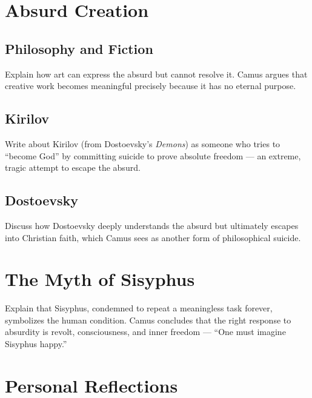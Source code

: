 \documentclass[12pt,letterpaper]{book}
\theoremstyle{definition}
\theoremstyle{remark}
\begin{document}
\chapter{Absurd Creation}

\section{Philosophy and Fiction}

Explain how art can express the absurd but cannot resolve it. Camus argues that creative work becomes meaningful precisely because it has no eternal purpose.

\section{Kirilov}

Write about Kirilov (from Dostoevsky's \textit{Demons}) as someone who tries to \enquote{become God} by committing suicide to prove absolute freedom — an extreme, tragic attempt to escape the absurd.

\section{Dostoevsky}

Discuss how Dostoevsky deeply understands the absurd but ultimately escapes into Christian faith, which Camus sees as another form of philosophical suicide.

\chapter{The Myth of Sisyphus}

Explain that Sisyphus, condemned to repeat a meaningless task forever, symbolizes the human condition. Camus concludes that the right response to absurdity is revolt, consciousness, and inner freedom — \enquote{One must imagine Sisyphus happy.}

\chapter{Personal Reflections}

\end{document}
